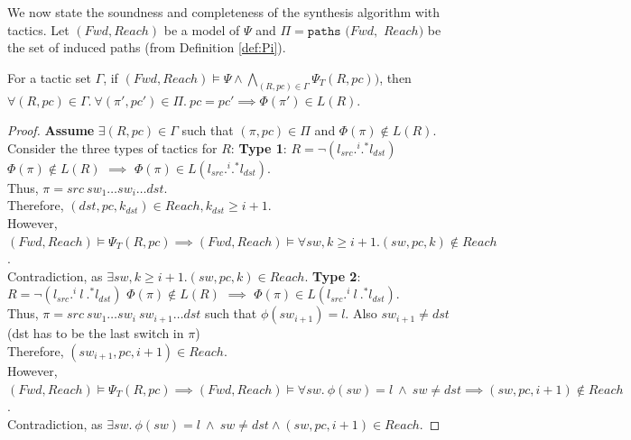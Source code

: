 %
We now state the soundness and completeness  
of the synthesis algorithm with tactics. 
Let $(Fwd, Reach)$ be a model of $\Psi$ and 
$\Pi = \texttt{paths}$ $(Fwd,$ $Reach)$ be the set
of induced paths (from Definition \ref{def:Pi}).
\begin{theorem}[Soundness]
	For a tactic set $\Gamma$, if $(Fwd, Reach) \models \Psi \wedge \bigwedge\limits_{(R, pc) \in \Gamma} \Psi_T(R,pc)) $, 
	then $\forall (R, pc) \in \Gamma. ~\forall(\pi', pc') \in \Pi. ~pc = pc' \implies \Phi(\pi') \in L(R)$.
\end{theorem}
\iffull
\begin{proof}
	\textbf{Assume} $\exists (R,pc) \in \Gamma$ such that $(\pi, pc) \in \Pi$ and $\Phi(\pi) \not\in L(R)$.
	Consider the three types of tactics for $R$: \newline
	\textbf{Type 1}: $R = \neg (l_{src} .^i .^* l_{dst})$ \\
	$\Phi(\pi) \not\in L(R)$ $\implies$ $\Phi(\pi) \in L(l_{src} .^i .^* l_{dst})$. \\
	Thus, $\pi = src\ sw_1 \ldots sw_i \ldots dst$. \\
	Therefore,  $(dst, pc, k_{dst}) \in Reach, k_{dst} \geq i + 1$. \\
	However, $(Fwd, Reach) \models \Psi_T(R, pc) \implies (Fwd, Reach) \models \forall sw,k \geq i + 1. (sw,pc,k) \notin Reach$.\\
	Contradiction, as $\exists sw, k \geq i + 1. (sw,pc,k) \in Reach$.
	\newline
	\newline
	\textbf{Type 2}: $R = \neg (l_{src} .^i \ l \ .^* l_{dst})$ \newline
	$\Phi(\pi) \not\in L(R)$ $\implies$ $\Phi(\pi) \in L (l_{src} .^i \ l \ .^* l_{dst})$. \\
	Thus, $\pi = src\ sw_1 \ldots sw_i \ sw_{i+1} \ldots dst$ such that $\phi(sw_{i+1}) = l$. Also $sw_{i+1} \not=dst$ (dst has to be the last switch in $\pi$)\\
	Therefore,  $(sw_{i+1}, pc, i+1) \in Reach$. \\
	However,
	$(Fwd, Reach) \models \Psi_T(R, pc) \implies (Fwd, Reach) \models \forall sw.~ \phi(sw) = l ~\wedge~ sw \not= dst \implies  (sw, pc, i + 1) \notin Reach$. \\
	Contradiction, as $\exists sw. ~ \phi(sw) = l ~\wedge~ sw \not= dst \wedge (sw,pc,i+1) \in Reach$.

\end{proof}
